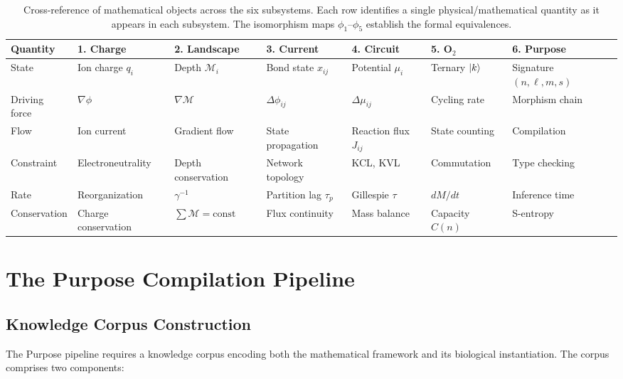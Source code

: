 \documentclass[twocolumn,10pt,a4paper]{article}
\theoremstyle{definition}
\theoremstyle{remark}
\newcommand{\Depth}{\mathcal{M}}
\newcommand{\taup}{\tau_p}
\begin{document}
\begin{table}[t]
\centering
\caption{Cross-reference of mathematical objects across the six subsystems. Each row identifies a single physical/mathematical quantity as it appears in each subsystem. The isomorphism maps $\phi_1$--$\phi_5$ establish the formal equivalences.}
\label{tab:crossref}
\begin{tabular}{@{}lllllll@{}}
\toprule
\textbf{Quantity} & \textbf{1. Charge} & \textbf{2. Landscape} & \textbf{3. Current} & \textbf{4. Circuit} & \textbf{5. O$_2$} & \textbf{6. Purpose} \\
\midrule
State & Ion charge $q_i$ & Depth $\Depth_i$ & Bond state $x_{ij}$ & Potential $\mu_i$ & Ternary $\ket{k}$ & Signature $(n,\ell,m,s)$ \\
Driving force & $\nabla\phi$ & $\nabla\Depth$ & $\Delta\phi_{ij}$ & $\Delta\mu_{ij}$ & Cycling rate & Morphism chain \\
Flow & Ion current & Gradient flow & State propagation & Reaction flux $J_{ij}$ & State counting & Compilation \\
Constraint & Electroneutrality & Depth conservation & Network topology & KCL, KVL & Commutation & Type checking \\
Rate & Reorganization & $\gamma^{-1}$ & Partition lag $\taup$ & Gillespie $\tau$ & $dM/dt$ & Inference time \\
Conservation & Charge conservation & $\sum\Depth = \mathrm{const}$ & Flux continuity & Mass balance & Capacity $C(n)$ & S-entropy \\
\bottomrule
\end{tabular}
\end{table}

\section{The Purpose Compilation Pipeline}
\label{sec:pipeline}

\subsection{Knowledge Corpus Construction}

The Purpose pipeline requires a knowledge corpus encoding both the mathematical framework and its biological instantiation. The corpus comprises two components:
\end{document}
